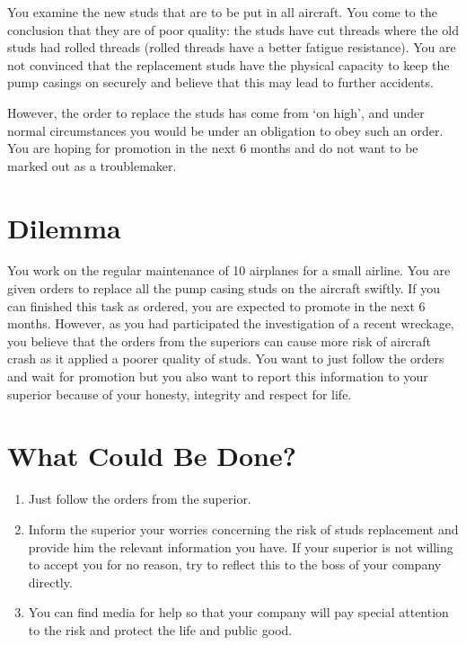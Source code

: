 \documentclass[11pt, a4paper]{article}
\begin{document}
You examine the new studs that are to be put in all aircraft. You come to the conclusion that they are of poor quality: the studs have cut threads where the old studs had rolled threads (rolled threads have a better fatigue resistance). You are not convinced that the replacement studs have the physical capacity to keep the pump casings on securely and believe that this may lead to further accidents.

However, the order to replace the studs has come from ‘on high’, and under normal circumstances you would be under an obligation to obey such an order. You are hoping for promotion in the next 6 months and do not want to be marked out as a troublemaker.


\section{Dilemma}

You work on the regular maintenance of 10 airplanes for a small airline. You are given orders to replace all the pump casing studs on the aircraft swiftly. If you can finished this task as ordered, you are expected to promote in the next 6 months. However, as you had participated the investigation of a recent wreckage, you believe that the orders from the superiors can cause more risk of aircraft crash as it applied a poorer quality of studs. You want to just follow the orders and wait for promotion but you also want to report this information to your superior because of your honesty, integrity and respect for life.

\section{What Could Be Done?}

\begin{enumerate}
\item Just follow the orders from the superior.
\item Inform the superior your worries concerning the risk of studs replacement and provide him the relevant information you have. If your superior is not willing to accept you for no reason, try to reflect this to the boss of your company directly.
\item You can find media for help so that your company will pay special attention to the risk and protect the life and public good.
\end{enumerate}
\end{document}
